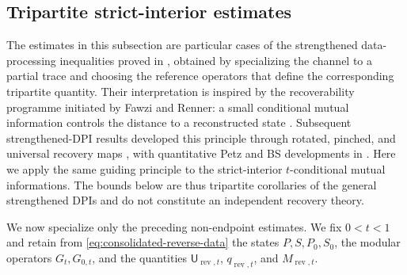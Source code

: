 \documentclass[11pt]{article}
\theoremstyle{remark}
\DeclareMathOperator{\rev}{rev}
\newcommand{\1}{\mathbbm{1}}
\begin{document}
\subsection{Tripartite strict-interior estimates}

The estimates in this subsection are particular cases of the
strengthened data-processing inequalities proved in
,
obtained by specializing the channel to a partial trace and choosing
the reference operators that define the corresponding tripartite
quantity.  Their interpretation is inspired by the recoverability
programme initiated by Fawzi and Renner: a small conditional mutual
information controls the distance to a reconstructed state
\cite{fawzi2015approximate}.  Subsequent strengthened-DPI results
developed this principle through rotated, pinched, and universal
recovery maps
\cite{berta2015monotonicity,sutter2016strengthened,junge2018universal},
with quantitative Petz and BS developments in
\cite{carlen2018recovery,carlen2020recovery-map,bluhm2020strengthened}.
Here we apply the same guiding principle to the strict-interior
$t$-conditional mutual informations.  The bounds below are thus
tripartite corollaries of the general strengthened DPIs and do not
constitute an independent recovery theory.

We now specialize only the preceding non-endpoint estimates.  We fix
$0<t<1$ and retain from \eqref{eq:consolidated-reverse-data} the
states $P,S,P_0,S_0$, the modular operators $G_t,G_{0,t}$, and the
quantities $\mathsf U_{\rev,t}$, $q_{\rev,t}$, and $M_{\rev,t}$.
\end{document}
